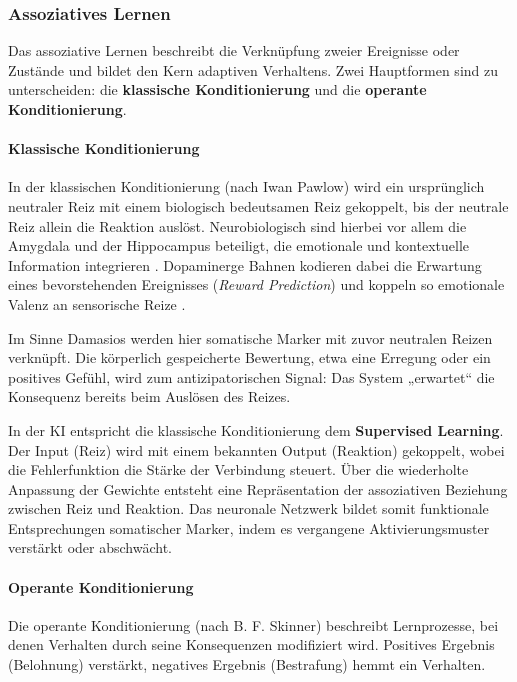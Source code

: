 \subsubsection*{Assoziatives Lernen}

Das assoziative Lernen beschreibt die Verknüpfung zweier Ereignisse oder Zustände und bildet den Kern adaptiven Verhaltens. Zwei Hauptformen sind zu unterscheiden: die \textbf{klassische Konditionierung} und die \textbf{operante Konditionierung}.

\paragraph{Klassische Konditionierung}
In der klassischen Konditionierung (nach Iwan Pawlow) wird ein ursprünglich neutraler Reiz mit einem biologisch bedeutsamen Reiz gekoppelt, bis der neutrale Reiz allein die Reaktion auslöst. Neurobiologisch sind hierbei vor allem die Amygdala und der Hippocampus beteiligt, die emotionale und kontextuelle Information integrieren \cite{LeDoux1996, Phelps2004}. Dopaminerge Bahnen kodieren dabei die Erwartung eines bevorstehenden Ereignisses (\emph{Reward Prediction}) und koppeln so emotionale Valenz an sensorische Reize \cite{Schultz1997}.  

Im Sinne Damasios werden hier somatische Marker mit zuvor neutralen Reizen verknüpft. Die körperlich gespeicherte Bewertung, etwa eine Erregung oder ein positives Gefühl, wird zum antizipatorischen Signal: Das System „erwartet“ die Konsequenz bereits beim Auslösen des Reizes.  

In der KI entspricht die klassische Konditionierung dem \textbf{Supervised Learning}. Der Input (Reiz) wird mit einem bekannten Output (Reaktion) gekoppelt, wobei die Fehlerfunktion die Stärke der Verbindung steuert. Über die wiederholte Anpassung der Gewichte entsteht eine Repräsentation der assoziativen Beziehung zwischen Reiz und Reaktion. Das neuronale Netzwerk bildet somit funktionale Entsprechungen somatischer Marker, indem es vergangene Aktivierungsmuster verstärkt oder abschwächt.

\paragraph{Operante Konditionierung}
Die operante Konditionierung (nach B. F. Skinner) beschreibt Lernprozesse, bei denen Verhalten durch seine Konsequenzen modifiziert wird. Positives Ergebnis (Belohnung) verstärkt, negatives Ergebnis (Bestrafung) hemmt ein Verhalten.  

